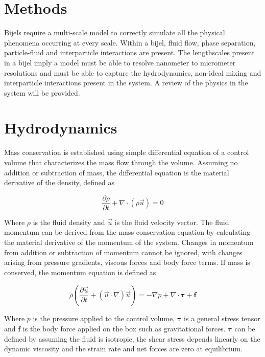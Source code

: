 \section{Methods}
\label{section:methods}

Bijels require a multi-scale model to correctly simulate all the physical phenomena occurring at every scale. Within a bijel, fluid flow,
phase separation, particle-fluid and interparticle interactions are present. The lengthscales present in a bijel imply a model must be able
to resolve nanometer to micrometer resolutions and must be able to capture the hydrodynamics, non-ideal mixing and interparticle interactions present
in the system. A review of the physics in the system will be provided. 

\section{Hydrodynamics}

Mass conservation is established using simple differential equation of a control volume that characterizes the mass flow through the volume. Assuming no
addition or subtraction of mass, the differential equation is the material derivative of the density, defined as

\begin{equation}
    \frac{\partial\rho}{\partial t} + \nabla\cdot\left(\rho\vec{u}\right) = 0
\end{equation}

Where $\rho$ is the fluid density and $\vec{u}$ is the fluid velocity vector. The fluid momentum can be derived from the mass conservation equation
by calculating the material derivative of the momentum of the system. Changes in momentum from addition or subtraction of momentum cannot be ignored,
with changes arising from pressure gradients, viscous forces and body force terms. If mass is conserved, the momentum equation is defined as

\begin{equation}
    \rho (\frac{\partial\vec{u}}{\partial t} + (\vec{u}\cdot\nabla)\vec{u}) = -\nabla p + \nabla \cdot \mathbf{\tau} + \mathbf{f}
\end{equation}

Where $p$ is the pressure applied to the control volume, $\mathbf{\tau}$ is a general stress tensor and $\mathbf{f}$ is the body force 
applied on the box such as gravitational forces. $\mathbf{\tau}$ can be defined by assuming the fluid is isotropic, the shear stress depends
linearly on the dynamic viscosity and the strain rate and net forces are zero at equilibrium.

